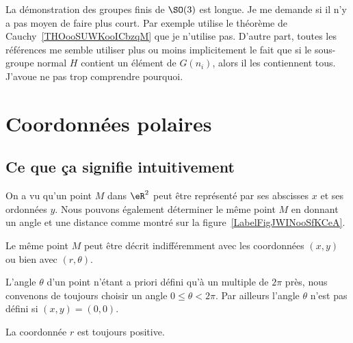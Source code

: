 \begin{probleme}
    La démonstration des groupes finis de \( \SO(3)\) est longue. Je me demande si il n'y a pas moyen de faire plus court. Par exemple \cite{ooYODPooHeNKiQ} utilise le théorème de Cauchy~\ref{THOooSUWKooICbzqM} que je n'utilise pas. D'autre part, toutes les références me semble utiliser plus ou moins implicitement le fait que si le sous-groupe normal \( H\) contient un élément de \( G(n_i)\), alors il les contiennent tous. J'avoue ne pas trop comprendre pourquoi.
\end{probleme}


\section{Coordonnées polaires}

\subsection{Ce que ça signifie intuitivement}

On a vu qu'un point $M$ dans $\eR^2$ peut être représenté par ses abscisses $x$ et ses ordonnées $y$. Nous pouvons également déterminer le même point $M$ en donnant un angle et une distance comme montré sur la figure~\ref{LabelFigJWINooSfKCeA}.
\newcommand{\CaptionFigJWINooSfKCeA}{Un point en coordonnées polaires est donné par sa distance à l'origine et par l'angle qu'il faut avec l'horizontale.}



Le même point $M$ peut être décrit indifféremment avec les coordonnées $(x,y)$ ou bien avec $(r,\theta)$.

\begin{remark}
	L'angle $\theta$ d'un point n'étant a priori défini qu'à un multiple de $2\pi$ près, nous convenons de toujours choisir un angle $0\leq\theta<2\pi$. Par ailleurs l'angle $\theta$ n'est pas défini si $(x,y)=(0,0)$.

	La coordonnée $r$ est toujours positive.
\end{remark}

